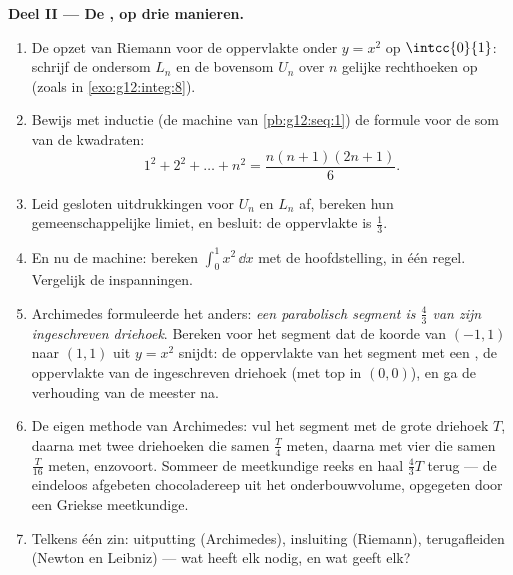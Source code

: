 \begin{problem}
\medskip
\noindent\textbf{Deel II --- De , op drie manieren.}
\begin{enumerate}[resume]
  \item De opzet van Riemann voor de oppervlakte onder $y = x^2$ op
        $\intcc{0}{1}$: schrijf de ondersom $L_n$ en de bovensom $U_n$ over
        $n$ gelijke rechthoeken op (zoals in \cref{exo:g12:integ:8}).
  \item Bewijs met inductie (de machine van \cref{pb:g12:seq:1}) de formule
        voor de som van de kwadraten:
        \[
        1^2 + 2^2 + \dots + n^2 = \frac{n(n+1)(2n+1)}{6} .
        \]
  \item Leid gesloten uitdrukkingen voor $U_n$ en $L_n$ af, bereken hun
        gemeenschappelijke limiet, en besluit: de oppervlakte is $\frac13$.
  \item En nu de machine: bereken $\int_0^1 x^2\,\dd x$ met de
        hoofdstelling, in één regel. Vergelijk de inspanningen.
  \item Archimedes formuleerde het anders: \emph{een parabolisch segment is
        $\frac43$ van zijn ingeschreven driehoek}. Bereken voor het segment
        dat de koorde van $(-1, 1)$ naar $(1, 1)$ uit $y = x^2$ snijdt: de
        oppervlakte van het segment met een , de oppervlakte van de
        ingeschreven driehoek (met top in $(0, 0)$), en ga de verhouding van
        de meester na.
  \item De eigen methode van Archimedes: vul het segment met de grote
        driehoek $T$, daarna met twee driehoeken die samen $\frac T4$ meten,
        daarna met vier die samen $\frac{T}{16}$ meten, enzovoort. Sommeer de
        meetkundige reeks en haal $\frac43 T$ terug --- de eindeloos afgebeten
        chocoladereep uit het onderbouwvolume, opgegeten door een Griekse
        meetkundige.
  \item Telkens één zin: uitputting (Archimedes), insluiting (Riemann),
        terugafleiden (Newton en Leibniz) --- wat heeft elk nodig, en wat
        geeft elk?
\end{enumerate}


\end{problem}
